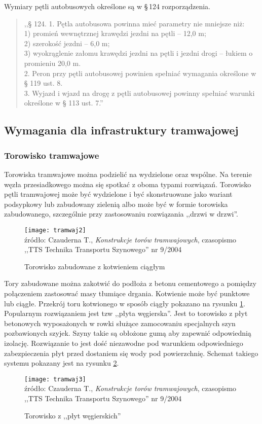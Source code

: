 \documentclass[twoside,12pt]{article}
\begin{document}
	Wymiary pętli autobusowych określone są w §\,124 rozporządzenia. 
	\begin{quote}
	,,§ 124. 1. Pętla autobusowa powinna mieć parametry nie mniejsze niż: \\
1) promień wewnętrznej krawędzi jezdni na pętli – 12,0 m; \\
2) szerokość jezdni – 6,0 m; \\
3) wyokrąglenie załomu krawędzi jezdni na pętli i jezdni drogi – łukiem o promieniu 20,0 m. \\
2. Peron przy pętli autobusowej powinien spełniać wymagania określone w § 119 ust. 8. \\
3. Wyjazd i wjazd na drogę z pętli autobusowej powinny spełniać warunki określone w § 113 ust. 7.''
	\end{quote}
	
	\subsection{Wymagania dla infrastruktury tramwajowej}	
	
	\subsubsection{Torowisko tramwajowe}
	Torowiska tramwajowe można podzielić na wydzielone oraz wspólne. Na terenie węzła przesiadkowego można się spotkać z oboma typami rozwiązań. Torowisko pętli tramwajowej może być wydzielone i być skonstruowane jako wariant podsypkowy lub zabudowany zielenią albo może być w formie torowiska zabudowanego, szczególnie przy zastosowaniu rozwiązania ,,drzwi w drzwi''. 
	\begin{figure}[H]
		\centering
		\caption{Torowisko zabudowane z kotwieniem ciągłym}
		\texttt{[image: tramwaj2]}\\
		\footnotesize{źródło: 	Czauderna T., \emph{Konstrukcje torów tramwajowych}, czasopismo ,,TTS Technika Transportu Szynowego'' %
		 nr 9/2004 \cite{czauderna}}
		\label{tramwaj2}
	\end{figure}
	
	Tory zabudowane można zakotwić do podłoża z betonu cementowego a pomiędzy połączeniem zastosować masy tłumiące drgania. Kotwienie może być punktowe lub ciągłe. Przekrój toru kotwionego w sposób ciągły pokazano na rysunku \ref{tramwaj2}. Popularnym rozwiązaniem jest tzw ,,płyta węgierska''. Jest to torowisko z płyt betonowych wyposażonych w rowki służące zamocowaniu specjalnych szyn pozbawionych szyjek. Szyny takie są obłożone gumą aby zapewnić odpowiednią izolację. Rozwiązanie to jest dość niezawodne pod warunkiem odpowiedniego zabezpieczenia płyt przed dostaniem się wody pod powierzchnię. Schemat takiego systemu pokazany jest na rysunku \ref{tramwaj3}.
	\begin{figure}[H]
		\centering
		\caption{Torowisko z ,,płyt węgierskich''}
		\texttt{[image: tramwaj3]}\\
		\footnotesize{źródło: 	Czauderna T., \emph{Konstrukcje torów tramwajowych}, czasopismo ,,TTS Technika Transportu Szynowego''%
		 nr 9/2004 \cite{czauderna}}
		\label{tramwaj3}
	\end{figure}
	
\end{document}
